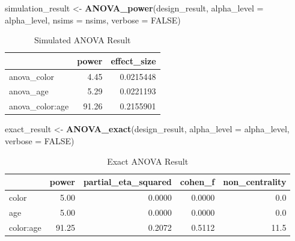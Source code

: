 \documentclass[]{book}
\newenvironment{Shaded}{\begin{snugshade}}{\end{snugshade}}
\newcommand{\DataTypeTok}[1]{\textcolor[rgb]{0.13,0.29,0.53}{#1}}
\newcommand{\KeywordTok}[1]{\textcolor[rgb]{0.13,0.29,0.53}{\textbf{#1}}}
\newcommand{\NormalTok}[1]{#1}
\newcommand{\OtherTok}[1]{\textcolor[rgb]{0.56,0.35,0.01}{#1}}
\newcommand{\StringTok}[1]{\textcolor[rgb]{0.31,0.60,0.02}{#1}}
\begin{document}
\begin{Shaded}
\begin{Highlighting}[]
\NormalTok{simulation_result <-}\StringTok{ }\KeywordTok{ANOVA_power}\NormalTok{(design_result, }
                                 \DataTypeTok{alpha_level =}\NormalTok{ alpha_level, }
                                 \DataTypeTok{nsims =}\NormalTok{ nsims,}
                                 \DataTypeTok{verbose =} \OtherTok{FALSE}\NormalTok{)}
\end{Highlighting}
\end{Shaded}

\begin{table}[t]

\caption{\label{tab:unnamed-chunk-134}Simulated ANOVA Result}
\centering
\begin{tabular}{l|r|r}
\hline
  & power & effect\_size\\
\hline
anova\_color & 4.45 & 0.0215448\\
\hline
anova\_age & 5.29 & 0.0221193\\
\hline
anova\_color:age & 91.26 & 0.2155901\\
\hline
\end{tabular}
\end{table}

\begin{Shaded}
\begin{Highlighting}[]
\NormalTok{exact_result <-}\StringTok{ }\KeywordTok{ANOVA_exact}\NormalTok{(design_result,}
                            \DataTypeTok{alpha_level =}\NormalTok{ alpha_level,}
                            \DataTypeTok{verbose =} \OtherTok{FALSE}\NormalTok{)}
\end{Highlighting}
\end{Shaded}

\begin{table}[t]

\caption{\label{tab:unnamed-chunk-136}Exact ANOVA Result}
\centering
\begin{tabular}{l|r|r|r|r}
\hline
  & power & partial\_eta\_squared & cohen\_f & non\_centrality\\
\hline
color & 5.00 & 0.0000 & 0.0000 & 0.0\\
\hline
age & 5.00 & 0.0000 & 0.0000 & 0.0\\
\hline
color:age & 91.25 & 0.2072 & 0.5112 & 11.5\\
\hline
\end{tabular}
\end{table}
\end{document}
